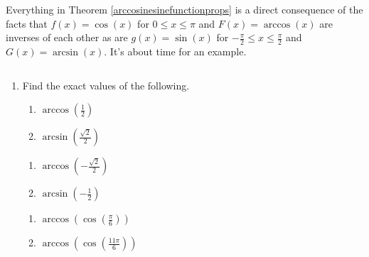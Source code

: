 \documentclass[12pt]{ximera}
\begin{document}

\pagebreak

Everything in Theorem \ref{arccosinesinefunctionprops} is a direct consequence of the facts that $f(x) = \cos(x)$ for $0 \leq x \leq \pi$ and $F(x) = \arccos(x)$ are inverses of each other as are $g(x) = \sin(x)$ for $-\frac{\pi}{2} \leq x \leq \frac{\pi}{2}$ and $G(x) = \arcsin(x)$.  It's about time for an example.

\begin{example}  \label{arccosinesineex} $~$

\begin{enumerate}  

\item Find the exact values of the following.

\begin{multicols}{2}

\begin{enumerate}

\item  $\arccos\left(\frac{1}{2}\right)$ 
\item  $\arcsin\left(\frac{\sqrt{2}}{2}\right)$

\setcounter{HW}{\value{enumii}}

\end{enumerate}

\end{multicols}

\begin{multicols}{2}

\begin{enumerate}

\setcounter{enumii}{\value{HW}}

\item  $\arccos\left(-\frac{\sqrt{2}}{2}\right)$
\item  $\arcsin\left(-\frac{1}{2}\right)$

\setcounter{HW}{\value{enumii}}

\end{enumerate}

\end{multicols}

\begin{multicols}{2}

\begin{enumerate}

\setcounter{enumii}{\value{HW}}

\item  $\arccos\left( \cos\left(\frac{\pi}{6}\right)\right)$
\item  $\arccos\left( \cos\left(\frac{11\pi}{6}\right)\right)$


\end{enumerate}
\end{multicols}
\end{enumerate}
\end{example}
\end{document}

